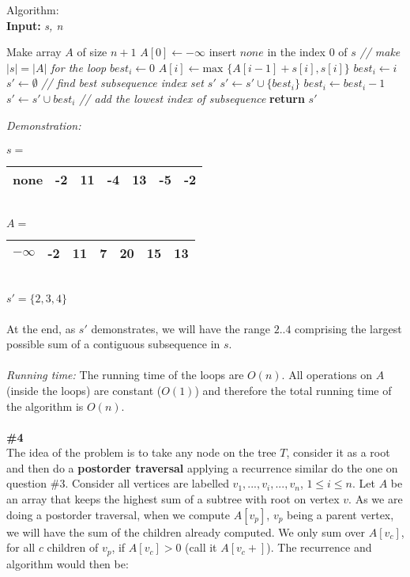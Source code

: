 \documentclass{article}
\begin{document}
Algorithm:\\
\textbf{Input:} \textit{s, n}
\begin{algorithmic}
\State Make array $A$ of size $n + 1$
\State $A[0] \gets -\infty$
\State insert $none$ in the index $0$ of $s$ \textit{// make $|s| = |A|$ for the loop}
\State $best_i \gets 0$
  \State $A[i] \gets \text{max } \{A[i-1]+s[i], s[i] \}$
    \State $best_i \gets i$
  \EndIf
\EndFor
\State $s' \gets \emptyset$ \textit{ // find best subsequence index set $s'$}
  \State $s' \gets s' \cup \{ best_i \}$
  \State $best_i \gets best_i - 1$
\EndWhile
\State $s' \gets s' \cup best_i$ \textit{// add the lowest index of subsequence}
\State \textbf{return} $s'$\\
\end{algorithmic}
\textit{Demonstration:}
\\\\
$s = $
\begin{tabular}{ |c|c|c|c|c|c|c| } 
 \hline
 none & -2 & 11 & -4 & 13 & -5 & -2 \\
 \hline
\end{tabular}
\\
$A = $
\begin{tabular}{ |c|c|c|c|c|c|c| } 
 \hline
 $-\infty$ & -2 & 11 & 7 & \textbf{20} & 15 & 13 \\
 \hline
\end{tabular}
\\
$s' = \{ 2, 3, 4\}$
\\
\\
At the end, as $s'$ demonstrates, we will have the range $2..4$ comprising the largest possible sum of a contiguous subsequence in $s$.
\\
\\
\textit{Running time:} The running time of the loops are $O(n)$. All operations on $A$ (inside the loops) are constant ($O(1)$) and therefore the total running time of the algorithm is $O(n)$.
\\
\\
\textbf{\#4}
\\
The idea of the problem is to take any node on the tree $T$, consider it as a root and then do a \textbf{postorder traversal} applying a recurrence similar do the one on question $\#3$. Consider all vertices are labelled $v_1, ..., v_i, ..., v_n$, $1 \leq i \leq n$. Let $A$ be an array that keeps the highest sum of a subtree with root on vertex $v$. As we are doing a postorder traversal, when we compute $A[v_p]$,  $v_p$ being a parent vertex, we will have the sum of the children already computed. We only sum over $A[v_c]$, for all $c$ children of $v_p$, if $A[v_c] > 0$ (call it $A[v_c{+}]$). The recurrence and algorithm would then be:
\end{document}
